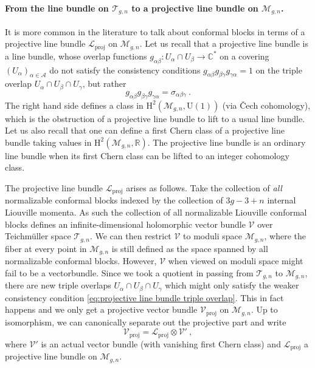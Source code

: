 \documentclass[12pt,a4paper]{article}
\newcommand{\be}{\begin{equation}}
\newcommand{\ee}{\end{equation}}
\begin{document}
\paragraph{From the line bundle on $\mathcal{T}_{g,n}$ to a projective line bundle on $\mathcal{M}_{g,n}$.} It is more common in the literature to talk about conformal blocks in terms of a projective line bundle $\mathscr{L}_\text{proj}$ on $\mathcal{M}_{g,n}$. Let us recall that a projective line bundle is a line bundle, whose overlap functions $g_{\alpha\beta}:U_\alpha \cap U_\beta \longrightarrow \mathbb{C}^*$ on a covering $(U_\alpha)_{\alpha \in \mathcal{A}}$ do not satisfy the consistency conditions $g_{\alpha \beta}g_{\beta \gamma} g_{\gamma\alpha}=1$ on the triple overlap $U_\alpha \cap U_\beta \cap U_\gamma$, but rather 
\be 
g_{\alpha \beta}g_{\beta \gamma} g_{\gamma\alpha}=\sigma_{\alpha\beta\gamma}\ . \label{eq:projective line bundle triple overlap}
\ee
The right hand side defines a class in $\mathrm{H}^2(\mathcal{M}_{g,n},\mathrm{U}(1))$ (via \v{C}ech cohomology), which is the obstruction of a projective line bundle to lift to a usual line bundle. Let us also recall that one can define a first Chern class of a projective line bundle taking values in $\mathrm{H}^2(\mathcal{M}_{g,n},\mathbb{R})$. The projective line bundle is an ordinary line bundle when its first Chern class can be lifted to an integer cohomology class.

The projective line bundle $\mathscr{L}_\text{proj}$ arises as follows. Take the collection of \emph{all} normalizable conformal blocks indexed by the collection of $3g-3+n$ internal Liouville momenta. As such the collection of all normalizable Liouville conformal blocks defines an infinite-dimensional holomorphic vector bundle $\mathscr{V}$ over Teichm\"uller space $\mathcal{T}_{g,n}$. We can then restrict $\mathscr{V}$ to moduli space $\mathcal{M}_{g,n}$, where the fiber at every point in $\mathcal{M}_{g,n}$ is still defined as the space spanned by all normalizable conformal blocks.
However, $\mathscr{V}$ when viewed on moduli space might fail to be a vectorbundle. Since we took a quotient in passing from $\mathcal{T}_{g,n}$ to $\mathcal{M}_{g,n}$, there are new triple overlaps $U_\alpha \cap U_\beta \cap U_\gamma$ which might only satisfy the weaker consistency condition \eqref{eq:projective line bundle triple overlap}. This in fact happens and we only get a projective vector bundle $\mathscr{V}_\text{proj}$ on $\mathcal{M}_{g,n}$. Up to isomorphism, we can canonically separate out the projective part and write
\be 
\mathscr{V}_\text{proj}=\mathscr{L}_\text{proj} \otimes \mathscr{V}'\ ,
\ee
where $\mathscr{V}'$ is an actual vector bundle (with vanishing first Chern class) and $\mathscr{L}_\text{proj}$ a projective line bundle on $\mathcal{M}_{g,n}$.
\end{document}
